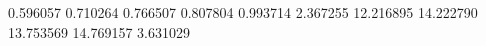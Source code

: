 0.596057
0.710264
0.766507
0.807804
0.993714
2.367255
12.216895
14.222790
13.753569
14.769157
3.631029
